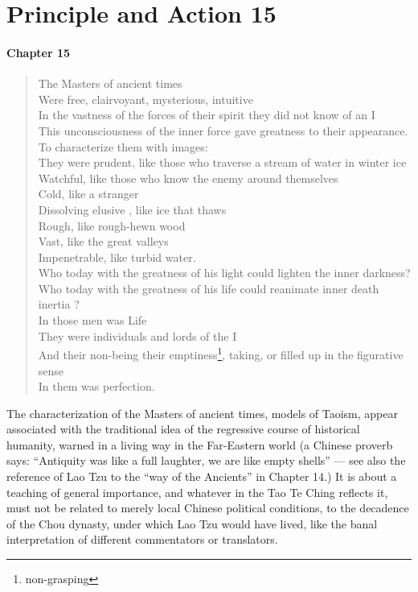 \section{Principle and Action 15}

\paragraph{Chapter 15}

\begin{verse}
The Masters of ancient times\\
Were free, clairvoyant, mysterious, intuitive\\
In the vastness of the forces of their spirit they did not know of an I\\
This unconsciousness of the inner force gave greatness to their appearance.\\
To characterize them with images:\\
They were prudent, like those who traverse a stream of water in winter ice \\
Watchful, like those who know the enemy around themselves\\
Cold, like a stranger\\
Dissolving elusive , like ice that thaws\\
Rough, like rough-hewn wood\\
Vast, like the great valleys\\
Impenetrable, like turbid water.\\
Who today with the greatness of his light could lighten the inner darkness?\\
Who today with the greatness of his life could reanimate inner death inertia ?\\
In those men was Life\\
They were individuals and lords of the I\\
And their non-being their emptiness\footnote{non-grasping}, taking, or filled up in the figurative sense \\
In them was perfection.
\end{verse}

The characterization of the Masters of ancient times, models of Taoism, appear associated with the traditional idea of the regressive course of historical humanity, warned in a living way in the Far-Eastern world (a Chinese proverb says: ``Antiquity was like a full laughter, we are like empty shells'' --- see also the reference of Lao Tzu to the ``way of the Ancients'' in Chapter 14.) It is about a teaching of general importance, and whatever in the Tao Te Ching reflects it, must not be related to merely local Chinese political conditions, to the decadence of the Chou dynasty, under which Lao Tzu would have lived, like the banal interpretation of different commentators or translators.

